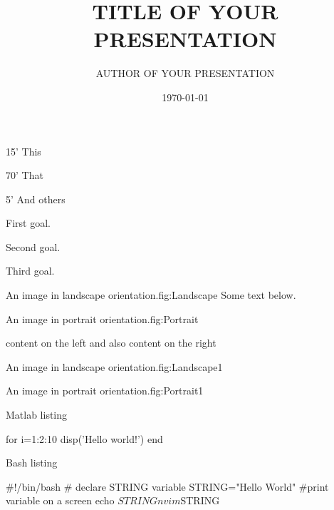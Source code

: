 \ifnum\conditionmacro=1 \documentclass[handout,usenames,dvipsnames]{beamer}\fi
\title{TITLE OF YOUR PRESENTATION}
\author{AUTHOR OF YOUR PRESENTATION}
\date{\today}
\begin{document}
\maketitle

\begin{TFTimeSchedule}
\item 15' This
\item 70' That
\item 5'  And others
\end{TFTimeSchedule}

\begin{TFLearningObjectives}
\item First goal.
\item Second goal.
\item Third goal.
\end{TFLearningObjectives}

\begin{TFPicture}[Landscape]{An image in landscape orientation.}{fig:Landscape}
Some text below.
\end{TFPicture}

\begin{TFPicture}[Portrait]{An image in portrait orientation.}{fig:Portrait}
\end{TFPicture}

\begin{TFTwoColumns}[Title]
{content on the left}
{and also content on the right}
\end{TFTwoColumns}

\begin{TFTwoColumns}[Title]
{
\begin{TPPicture}[Landscape]{An image in landscape orientation.}{fig:Landscape1}
\end{TPPicture}
}
{
\begin{TPPicture}[Portrait]{An image in portrait orientation.}{fig:Portrait1}
\end{TPPicture}
}
\end{TFTwoColumns}

\begin{frame}[fragile]{Matlab listing}
\begin{TFMatlab}
for i=1:2:10
    disp('Hello world!')
end
\end{TFMatlab}
\end{frame}

\begin{frame}[fragile]{Bash listing}
\begin{TFBash}
#!/bin/bash
# declare STRING variable
STRING="Hello World"
#print variable on a screen
echo $STRING
nvim $STRING
\end{TFBash}
\end{frame}
\end{document}
